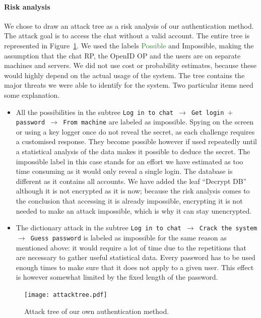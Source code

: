 \documentclass[11pt,a4paper]{article}
\begin{document}
\paragraph{Risk analysis} We chose to draw an attack tree as a risk analysis of our authentication method. The attack goal is to access the chat without a valid account. The entire tree is represented in Figure~\ref{fig:attacktree}.
We used the labels \textcolor{ForestGreen}{Possible} and \textcolor{BrickRed}{Impossible}, making the assumption that the chat RP, the OpenID OP and the users are on separate machines and servers. We did not use cost or probability estimates, because these would highly depend on the actual usage of the system.
The tree contains the major threats we were able to identify for the system. Two particular items need some explanation.
\begin{itemize}
\item All the possibilities in the subtree \texttt{Log in to chat $\rightarrow$ Get login $+$ password $\rightarrow$ From machine} are labeled as impossible. Spying on the screen or using a key logger once do not reveal the secret, as each challenge requires a customised response. They become possible however if used repeatedly until a statistical analysis of the data makes it possible to deduce the secret. The impossible label in this case stands for an effort we have estimated as too time consuming as it would only reveal a single login. The database is different as it contains all accounts. We have added the leaf ``Decrypt DB'' although it is not encrypted as it is now; because the risk analysis comes to the conclusion that accessing it is already impossible, encrypting it is not needed to make an attack impossible, which is why it can stay unencrypted.
\item The dictionary attack in the subtree \texttt{Log in to chat $\rightarrow$ Crack the system $\rightarrow$ Guess password} is labeled as impossible for the same reason as mentioned above: it would require a lot of time due to the repetitions that are necessary to gather useful statistical data. Every password has to be used enough times to make sure that it does not apply to a given user. This effect is however somewhat limited by the fixed length of the password.
\end{itemize}
\begin{figure}
\centering
\texttt{[image: attacktree.pdf]}
\caption{Attack tree of our own authentication method.}
\label{fig:attacktree}
\end{figure}
\end{document}
